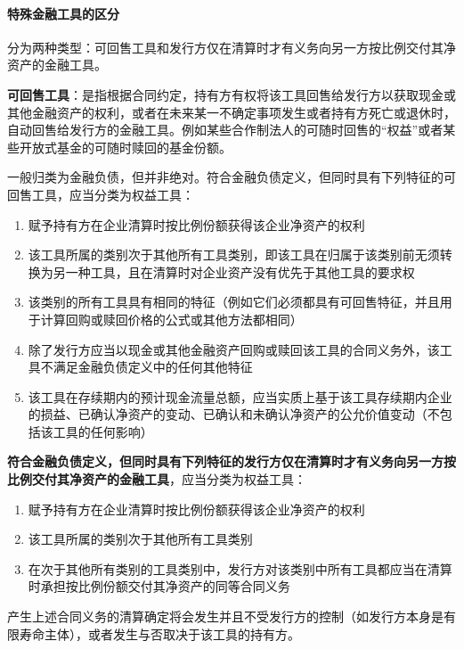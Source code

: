 \documentclass[UTF8,12pt]{ctexart}
\numberwithin{equation}{section} %
\numberwithin{figure}{section}
\numberwithin{table}{section}
\begin{document}
	\paragraph{特殊金融工具的区分}
	分为两种类型：可回售工具和发行方仅在清算时才有义务向另一方按比例交付其净资产的金融工具。
	
	\textbf{可回售工具}：是指根据合同约定，持有方有权将该工具回售给发行方以获取现金或其他金融资产的权利，或者在未来某一不确定事项发生或者持有方死亡或退休时，自动回售给发行方的金融工具。例如某些合作制法人的可随时回售的“权益”或者某些开放式基金的可随时赎回的基金份额。
	
	一般归类为金融负债，但并非绝对。符合金融负债定义，但同时具有下列特征的可回售工具，应当分类为权益工具：
	\begin{enumerate}
		\item 赋予持有方在企业清算时按比例份额获得该企业净资产的权利
		
		\item 该工具所属的类别次于其他所有工具类别，即该工具在归属于该类别前无须转换为另一种工具，且在清算时对企业资产没有优先于其他工具的要求权
		
		\item 该类别的所有工具具有相同的特征（例如它们必须都具有可回售特征，并且用于计算回购或赎回价格的公式或其他方法都相同）
		
		\item 除了发行方应当以现金或其他金融资产回购或赎回该工具的合同义务外，该工具不满足金融负债定义中的任何其他特征
		
		\item 该工具在存续期内的预计现金流量总额，应当实质上基于该工具存续期内企业的损益、已确认净资产的变动、已确认和未确认净资产的公允价值变动（不包括该工具的任何影响）
	\end{enumerate}

	\textbf{符合金融负债定义，但同时具有下列特征的发行方仅在清算时才有义务向另一方按比例交付其净资产的金融工具}，应当分类为权益工具：
	\begin{enumerate}
		\item 赋予持有方在企业清算时按比例份额获得该企业净资产的权利
		
		\item 该工具所属的类别次于其他所有工具类别
		
		\item 在次于其他所有类别的工具类别中，发行方对该类别中所有工具都应当在清算时承担按比例份额交付其净资产的同等合同义务
	\end{enumerate}
	产生上述合同义务的清算确定将会发生并且不受发行方的控制（如发行方本身是有限寿命主体），或者发生与否取决于该工具的持有方。
	
\end{document}

